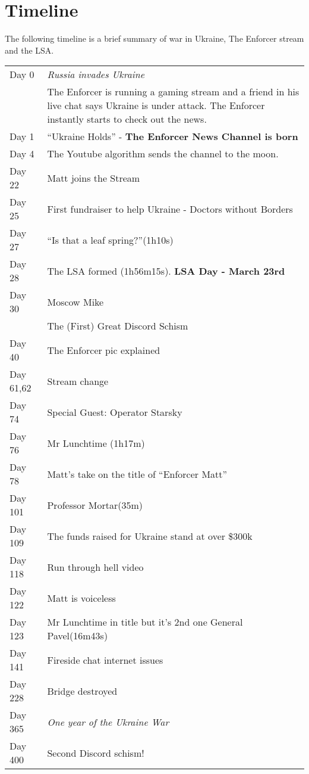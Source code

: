 \section{Timeline}
The following timeline is a brief summary of war in Ukraine, The Enforcer stream and the LSA.

\begin{longtable}{l p{12cm}}
Day 0   & \textit{Russia invades Ukraine} \\
        & The Enforcer is running a gaming stream and a friend in his live chat
    says Ukraine is under attack. The Enforcer instantly starts to check out the news.\\
Day 1   & ``Ukraine Holds'' - \textbf{The Enforcer News Channel is born} \\
Day 4   & The Youtube algorithm sends the channel to the moon. \\
Day 22  & Matt joins the Stream \\
Day 25  & First fundraiser to help Ukraine - Doctors without Borders \\
Day 27  & ``Is that a leaf spring?''(1h10s)  \\
Day 28  & The LSA formed (1h56m15s). \textbf{LSA Day - March 23rd} \\
Day 30  & Moscow Mike \\
        & The (First) Great Discord Schism \\
Day 40  & The Enforcer pic explained \\
Day 61,62 & Stream change \\
Day 74  & Special Guest: Operator Starsky \\ 
Day 76  & Mr Lunchtime (1h17m) \\
Day 78  & Matt's take on the title of ``Enforcer Matt'' \\ 
Day 101 & Professor Mortar(35m) \\
Day 109 & The funds raised for Ukraine stand at over \$300k \\
Day 118 & Run through hell video \\
Day 122 & Matt is voiceless \\ 
Day 123 & Mr Lunchtime in title but it's 2nd one General Pavel(16m43s) \\
Day 141 & Fireside chat internet issues \\
Day 228 & Bridge destroyed \\
Day 365 & \textit{One year of the Ukraine War} \\
Day 400 & Second Discord schism! \\

\end{longtable}
